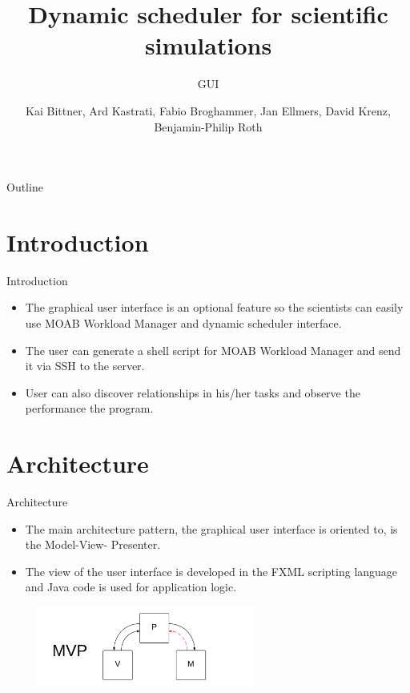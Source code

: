 \documentclass[18pt]{beamer}
\title[GUI]{Dynamic scheduler for scientific simulations}
\subtitle{GUI}
\author{Kai Bittner, Ard Kastrati, Fabio Broghammer, Jan Ellmers, David Krenz, Benjamin-Philip Roth}
\institute{Steinbuch Centre for Computing (SCC)}
\begin{document}

\begin{frame}
\titlepage
\end{frame}

\begin{frame}{Outline}
\tableofcontents
\end{frame}

\section{Introduction}
	\begin{frame}{Introduction}
		\begin{itemize}
			\pause
			\item The graphical user interface is an optional feature so the scientists can easily use MOAB Workload Manager and dynamic scheduler interface. 
			\pause
			\item The user can generate a shell script for MOAB Workload Manager and send it via SSH to the server.
			\pause
			\item User can also discover relationships in his/her tasks and observe the performance the program. 
			
		\end{itemize}
	\end{frame}
	
\section{Architecture}
	\begin{frame}{Architecture}
		\begin{itemize}
			\item The main architecture pattern, the graphical user interface is oriented to, is the Model-View-
Presenter. 
	        \item The view of the user interface is developed in the FXML scripting language and Java code is used for application logic.
	        
				\includegraphics[width=300px, height=100px]{images/mvp.png}
		\end{itemize}
	\end{frame}
\end{document}
